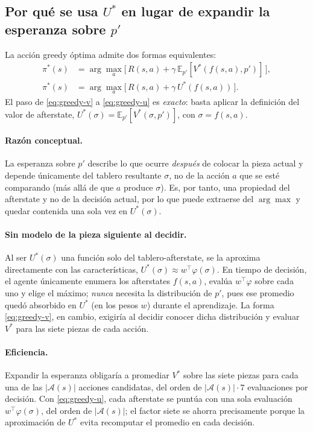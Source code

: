 \subsection{Por qué se usa \texorpdfstring{$U^{*}$}{U*} en lugar de expandir la esperanza sobre \texorpdfstring{$p'$}{p'}}
La acción greedy óptima admite dos formas equivalentes:
\begin{align}
    \pi^{*}(s) & = \arg\max_{a}
    \big[\, R(s,a) + \gamma\, \mathbb{E}_{p'}\!\left[ V^{*}(f(s,a), p') \right] \,\big],
    \label{eq:greedy-v}         \\
    \pi^{*}(s) & = \arg\max_{a}
    \big[\, R(s,a) + \gamma\, U^{*}(f(s,a)) \,\big].
    \label{eq:greedy-u}
\end{align}
El paso de \eqref{eq:greedy-v} a \eqref{eq:greedy-u} es \emph{exacto}: basta
aplicar la definición del valor de afterstate,
$U^{*}(\sigma) = \mathbb{E}_{p'}\!\left[ V^{*}(\sigma, p') \right]$, con
$\sigma = f(s,a)$.

\paragraph{Razón conceptual.} La esperanza sobre $p'$ describe lo que ocurre
\emph{después} de colocar la pieza actual y depende únicamente del tablero
resultante $\sigma$, no de la acción $a$ que se esté comparando (más allá de que
$a$ produce $\sigma$). Es, por tanto, una propiedad del afterstate y no de la
decisión actual, por lo que puede extraerse del $\arg\max$ y quedar contenida una
sola vez en $U^{*}(\sigma)$.

\paragraph{Sin modelo de la pieza siguiente al decidir.} Al ser $U^{*}(\sigma)$
una función solo del tablero-afterstate, se la aproxima directamente con las
características, $U^{*}(\sigma) \approx w^{\top}\varphi(\sigma)$. En tiempo de
decisión, el agente únicamente enumera los afterstates $f(s,a)$, evalúa
$w^{\top}\varphi$ sobre cada uno y elige el máximo; \emph{nunca} necesita la
distribución de $p'$, pues ese promedio quedó absorbido en $U^{*}$ (en los pesos
$w$) durante el aprendizaje. La forma \eqref{eq:greedy-v}, en cambio, exigiría al
decidir conocer dicha distribución y evaluar $V^{*}$ para las siete piezas de cada
acción.

\paragraph{Eficiencia.} Expandir la esperanza obligaría a promediar $V^{*}$ sobre
las siete piezas para cada una de las $|\mathcal{A}(s)|$ acciones candidatas, del
orden de $|\mathcal{A}(s)| \cdot 7$ evaluaciones por decisión. Con
\eqref{eq:greedy-u}, cada afterstate se puntúa con una sola evaluación
$w^{\top}\varphi(\sigma)$, del orden de $|\mathcal{A}(s)|$; el factor siete se
ahorra precisamente porque la aproximación de $U^{*}$ evita recomputar el promedio
en cada decisión.

